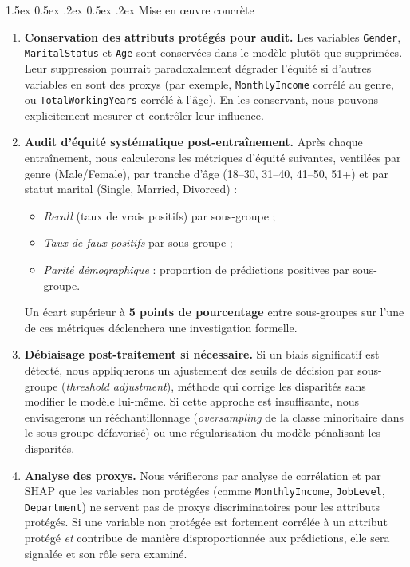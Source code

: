 \documentclass[12pt,a4paper]{article}
\makeatletter
\renewcommand\paragraph{\@startsection{paragraph}{4}{\z@}%
  {1.5ex \@plus 0.5ex \@minus .2ex}%
  {0.5ex \@plus .2ex}%
  {\normalfont\normalsize\bfseries}}
\makeatother
\begin{document}
\paragraph{Mise en \oe uvre concrète}
\begin{enumerate}
    \item \textbf{Conservation des attributs protégés pour audit.} Les variables \texttt{Gender}, \texttt{MaritalStatus} et \texttt{Age} sont conservées dans le modèle plutôt que supprimées. Leur suppression pourrait paradoxalement dégrader l'équité si d'autres variables en sont des proxys (par exemple, \texttt{MonthlyIncome} corrélé au genre, ou \texttt{TotalWorkingYears} corrélé à l'âge). En les conservant, nous pouvons explicitement mesurer et contrôler leur influence.
    \item \textbf{Audit d'équité systématique post-entraînement.} Après chaque entraînement, nous calculerons les métriques d'équité suivantes, ventilées par genre (Male/Female), par tranche d'âge (18--30, 31--40, 41--50, 51+) et par statut marital (Single, Married, Divorced) :
    \begin{itemize}
        \item \textit{Recall} (taux de vrais positifs) par sous-groupe ;
        \item \textit{Taux de faux positifs} par sous-groupe ;
        \item \textit{Parité démographique} : proportion de prédictions positives par sous-groupe.
    \end{itemize}
    Un écart supérieur à \textbf{5 points de pourcentage} entre sous-groupes sur l'une de ces métriques déclenchera une investigation formelle.
    \item \textbf{Débiaisage post-traitement si nécessaire.} Si un biais significatif est détecté, nous appliquerons un ajustement des seuils de décision par sous-groupe (\textit{threshold adjustment}), méthode qui corrige les disparités sans modifier le modèle lui-même. Si cette approche est insuffisante, nous envisagerons un rééchantillonnage (\textit{oversampling} de la classe minoritaire dans le sous-groupe défavorisé) ou une régularisation du modèle pénalisant les disparités.
    \item \textbf{Analyse des proxys.} Nous vérifierons par analyse de corrélation et par SHAP que les variables non protégées (comme \texttt{MonthlyIncome}, \texttt{JobLevel}, \texttt{Department}) ne servent pas de proxys discriminatoires pour les attributs protégés. Si une variable non protégée est fortement corrélée à un attribut protégé \textit{et} contribue de manière disproportionnée aux prédictions, elle sera signalée et son rôle sera examiné.
\end{enumerate}
\end{document}
